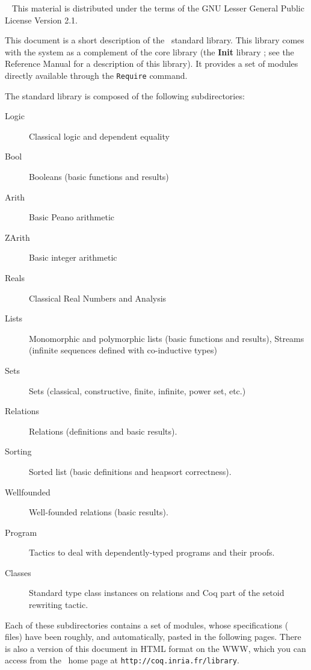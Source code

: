 \documentclass[11pt]{report}
\begin{document}
 
%
{\ }
{This material is distributed under the terms of the GNU Lesser
General Public License Version 2.1.}

\tableofcontents

\newpage

This document is a short description of the \Coq\ standard library.
This library comes with the system as a complement of the core library
(the {\bf Init} library ; see the Reference Manual for a description
of this library). It provides a set of modules directly available
through the \verb!Require! command.

The standard library is composed of the following subdirectories:
\begin{description}
  \item[Logic]  Classical logic and dependent equality
  \item[Bool]   Booleans (basic functions and results)
  \item[Arith]  Basic Peano arithmetic
  \item[ZArith] Basic integer arithmetic
  \item[Reals]  Classical Real Numbers and Analysis
  \item[Lists]  Monomorphic and polymorphic lists (basic functions and
                  results), Streams (infinite sequences defined 
                  with co-inductive types)
  \item[Sets]   Sets (classical, constructive, finite, infinite, power set,
                  etc.)
  \item[Relations] Relations (definitions and basic results).
  \item[Sorting] Sorted list (basic definitions and heapsort
                 correctness). 
  \item[Wellfounded] Well-founded relations (basic results).
  \item[Program] Tactics to deal with dependently-typed programs and
    their proofs.
  \item[Classes] Standard type class instances on relations and
    Coq part of the setoid rewriting tactic.
\end{description}


Each of these subdirectories contains a set of modules, whose
specifications (\gallina{} files) have
been roughly, and automatically, pasted in the following pages. There
is also a version of this document in HTML format on the WWW, which
you can access from the \Coq\ home page at
\texttt{http://coq.inria.fr/library}.


\end{document}
